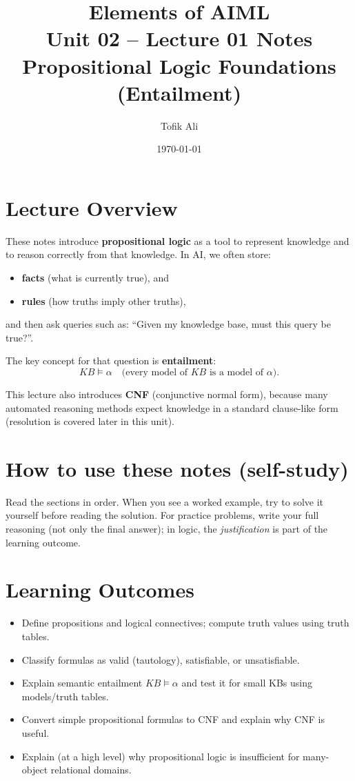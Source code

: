 \documentclass[11pt]{article}
\title{Elements of AIML\\Unit 02 -- Lecture 01 Notes\\Propositional Logic Foundations (Entailment)}
\author{Tofik Ali}
\date{\today}
\begin{document}
\maketitle
\tableofcontents

\section{Lecture Overview}
These notes introduce \textbf{propositional logic} as a tool to represent knowledge and to reason correctly from that knowledge.
In AI, we often store:
\begin{itemize}[leftmargin=*]
  \item \textbf{facts} (what is currently true), and
  \item \textbf{rules} (how truths imply other truths),
\end{itemize}
and then ask queries such as: ``Given my knowledge base, must this query be true?''.

The key concept for that question is \textbf{entailment}:
\[
  KB \models \alpha
  \quad\text{(every model of $KB$ is a model of $\alpha$).}
\]

This lecture also introduces \textbf{CNF} (conjunctive normal form), because many automated reasoning methods expect knowledge in a standard clause-like form (resolution is covered later in this unit).
\notesources{\AIMLUnitIISources}

\section{How to use these notes (self-study)}
Read the sections in order.
When you see a worked example, try to solve it yourself before reading the solution.
For practice problems, write your full reasoning (not only the final answer); in logic, the \emph{justification} is part of the learning outcome.

\section{Learning Outcomes}
\begin{itemize}[leftmargin=*]
  \item Define propositions and logical connectives; compute truth values using truth tables.
  \item Classify formulas as valid (tautology), satisfiable, or unsatisfiable.
  \item Explain semantic entailment $KB \models \alpha$ and test it for small KBs using models/truth tables.
  \item Convert simple propositional formulas to CNF and explain why CNF is useful.
  \item Explain (at a high level) why propositional logic is insufficient for many-object relational domains.
\end{itemize}
\end{document}
